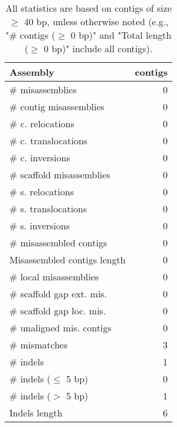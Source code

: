 \documentclass[12pt,a4paper]{article}
\begin{document}
\begin{table}[ht]
\begin{center}
\caption{All statistics are based on contigs of size $\geq$ 40 bp, unless otherwise noted (e.g., "\# contigs ($\geq$ 0 bp)" and "Total length ($\geq$ 0 bp)" include all contigs).}
\begin{tabular}{|l*{1}{|r}|}
\hline
Assembly & contigs \\ \hline
\# misassemblies & 0 \\ \hline
\hspace{2mm}\# contig misassemblies & 0 \\ \hline
\hspace{5mm}\# c. relocations & 0 \\ \hline
\hspace{5mm}\# c. translocations & 0 \\ \hline
\hspace{5mm}\# c. inversions & 0 \\ \hline
\hspace{2mm}\# scaffold misassemblies & 0 \\ \hline
\hspace{5mm}\# s. relocations & 0 \\ \hline
\hspace{5mm}\# s. translocations & 0 \\ \hline
\hspace{5mm}\# s. inversions & 0 \\ \hline
\# misassembled contigs & 0 \\ \hline
Misassembled contigs length & 0 \\ \hline
\# local misassemblies & 0 \\ \hline
\# scaffold gap ext. mis. & 0 \\ \hline
\# scaffold gap loc. mis. & 0 \\ \hline
\# unaligned mis. contigs & 0 \\ \hline
\# mismatches & 3 \\ \hline
\# indels & 1 \\ \hline
\hspace{5mm}\# indels ($\leq$ 5 bp) & 0 \\ \hline
\hspace{5mm}\# indels ($>$ 5 bp) & 1 \\ \hline
Indels length & 6 \\ \hline
\end{tabular}
\end{center}
\end{table}
\end{document}
